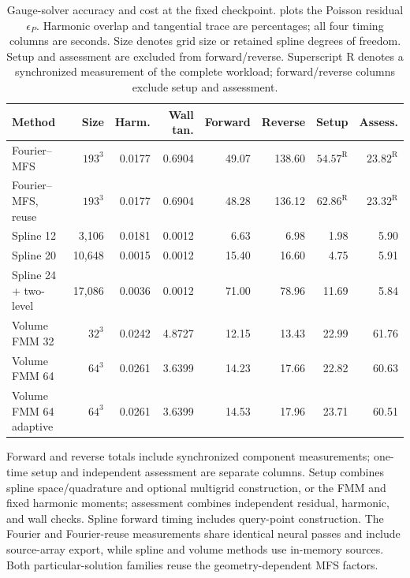 \begin{table}[!htb]\centering\footnotesize\setlength{\tabcolsep}{3pt}
\caption{Gauge-solver accuracy and cost at the fixed checkpoint.  plots the Poisson residual $\epsilon_P$. Harmonic overlap and tangential trace are percentages; all four timing columns are seconds. Size denotes grid size or retained spline degrees of freedom. Setup and assessment are excluded from forward/reverse. Superscript R denotes a synchronized measurement of the complete workload; forward/reverse columns exclude setup and assessment.}
\label{tab:gauge-solver-ablation}

\begin{tabular}{lrrrrrrr}\toprule
Method&Size&Harm.&Wall tan.&Forward&Reverse&Setup&Assess.\\\midrule
Fourier--MFS & $193^3$ & 0.0177 & 0.6904 & 49.07 & 138.60 & $54.57^{\mathrm R}$ & $23.82^{\mathrm R}$\\
Fourier--MFS, reuse & $193^3$ & 0.0177 & 0.6904 & 48.28 & 136.12 & $62.86^{\mathrm R}$ & $23.32^{\mathrm R}$\\
Spline 12 & 3,106 & 0.0181 & 0.0012 & 6.63 & 6.98 & 1.98 & 5.90\\
Spline 20 & 10,648 & 0.0015 & 0.0012 & 15.40 & 16.60 & 4.75 & 5.91\\
Spline 24 + two-level & 17,086 & 0.0036 & 0.0012 & 71.00 & 78.96 & 11.69 & 5.84\\
Volume FMM 32 & $32^3$ & 0.0242 & 4.8727 & 12.15 & 13.43 & 22.99 & 61.76\\
Volume FMM 64 & $64^3$ & 0.0261 & 3.6399 & 14.23 & 17.66 & 22.82 & 60.63\\
Volume FMM 64 adaptive & $64^3$ & 0.0261 & 3.6399 & 14.53 & 17.96 & 23.71 & 60.51\\\bottomrule\end{tabular}\end{table}

Forward and reverse totals include synchronized component measurements; one-time setup and independent assessment are separate columns. Setup combines spline space/quadrature and optional multigrid construction, or the FMM and fixed harmonic moments; assessment combines independent residual, harmonic, and wall checks. Spline forward timing includes query-point construction. The Fourier and Fourier-reuse measurements share identical neural passes and include source-array export, while spline and volume methods use in-memory sources. Both particular-solution families reuse the geometry-dependent MFS factors.

